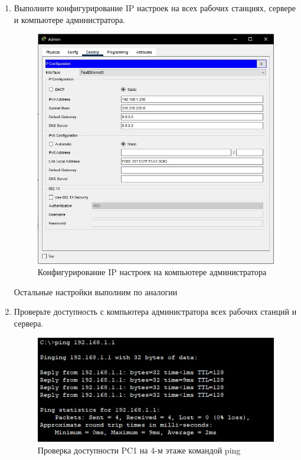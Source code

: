 \documentclass[bachelor, och, labwork]{shiza}
\begin{document}
\begin{enumerate}
    \item Выполните конфигурирование IP настроек на всех рабочих станциях, сервере и компьютере администратора.
    
    \begin{figure}[H]
        \centering      %
        \includegraphics[width=1\textwidth]{9}
        \caption{Конфигурирование IP настроек на компьютере администратора}
        \label{fig:image1}
    \end{figure}

    Остальные настройки выполним по аналогии

    \item Проверьте доступность с компьютера администратора всех рабочих станций и сервера.
    
    \begin{figure}[H]
        \centering      %
        \includegraphics[width=1\textwidth]{10}
        \caption{Проверка доступности PC1 на 4-м этаже командой ping}
        \label{fig:image1}
    \end{figure}


\end{enumerate}
\end{document}
